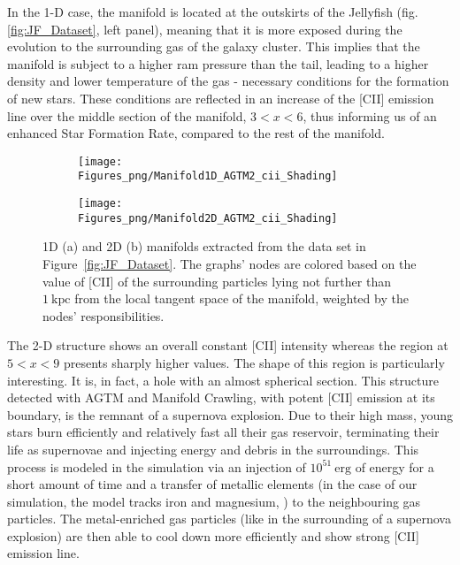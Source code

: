 In the 1-D case, the manifold is located at the outskirts of the Jellyfish (fig. \ref{fig:JF_Dataset}, left panel), meaning that it is more exposed during the evolution to the surrounding gas of the galaxy cluster. This implies that the manifold is subject to a higher ram pressure than the tail, leading to a higher density and lower temperature of the gas - necessary conditions for the formation of new stars. These conditions are reflected in an increase of the [CII] emission line over the middle section of the manifold, $3 < x < 6$, thus informing us of an enhanced Star Formation Rate, compared to the rest of the manifold.
\begin{figure}[ht]
\centering
\begin{subfigure}[t]{0.48\textwidth}
 \label{subfig:1dManGraph}
 \caption{}
 \texttt{[image: Figures\_png/Manifold1D\_AGTM2\_cii\_Shading]}
\end{subfigure}
\begin{subfigure}[t]{0.49\textwidth}
 \label{subfig:2dManGraph}
 \caption{}
 \texttt{[image: Figures\_png/Manifold2D\_AGTM2\_cii\_Shading]}
\end{subfigure}
\caption{1D (a) and 2D (b) manifolds extracted from the data set in Figure~\ref{fig:JF_Dataset}.
The graphs' nodes are colored based on the value of [CII] of the surrounding particles lying not further than $\mathrm{1~kpc}$ from the local tangent space of the manifold, weighted by the nodes' responsibilities.}
\label{fig:Man2D}
\end{figure}
The 2-D structure shows an overall constant [CII] intensity whereas the region at $5 < x < 9$ presents sharply higher values.
The shape of this region is particularly interesting. It is, in fact, a hole with an almost spherical section. This structure detected with AGTM and Manifold Crawling, with potent [CII] emission at its boundary, is the remnant of a supernova explosion. Due to their high mass, young stars burn efficiently and relatively fast all their gas reservoir, terminating their life as supernovae and injecting energy and debris in the surroundings.
This process is modeled in the simulation via an injection of $10^{51}~\mathrm{erg}$ of energy for a short amount of time and a transfer of metallic elements (in the case of our simulation, the model tracks iron and magnesium, \cite{DeRijcke2013}) to the neighbouring gas particles. The metal-enriched gas particles (like in the surrounding of a supernova explosion) are then able to cool down more efficiently and show strong [CII] emission line. 

